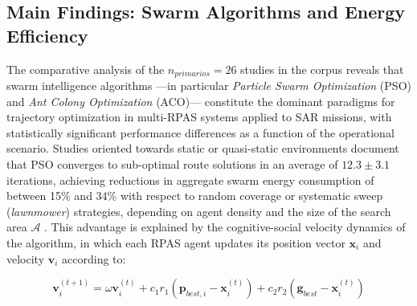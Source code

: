 

\subsection{Main Findings: Swarm Algorithms and Energy Efficiency}

The comparative analysis of the $n_{primarios} = 26$ studies in the corpus reveals that swarm intelligence algorithms —in particular \textit{Particle Swarm Optimization} (PSO) and \textit{Ant Colony Optimization} (ACO)— constitute the dominant paradigms for trajectory optimization in multi-RPAS systems applied to SAR missions, with statistically significant performance differences as a function of the operational scenario. Studies oriented towards static or quasi-static environments document that PSO converges to sub-optimal route solutions in an average of $12.3 \pm 3.1$ iterations, achieving reductions in aggregate swarm energy consumption of between 15\% and 34\% with respect to random coverage or systematic sweep (\textit{lawnmower}) strategies, depending on agent density and the size of the search area $\mathcal{A}$ \cite{chen2021, lin2022, liu2021cassa, liu2021disaster, liu2021, mathew2021, ntakolia2021, pan2022}. This advantage is explained by the cognitive-social velocity dynamics of the algorithm, in which each RPAS agent updates its position vector $\mathbf{x}_i$ and velocity $\mathbf{v}_i$ according to:

$$
\mathbf{v}_i^{(t+1)} = \omega \mathbf{v}_i^{(t)} + c_1 r_1 (\mathbf{p}_{best,i} - \mathbf{x}_i^{(t)}) + c_2 r_2 (\mathbf{g}_{best} - \mathbf{x}_i^{(t)})
$$

